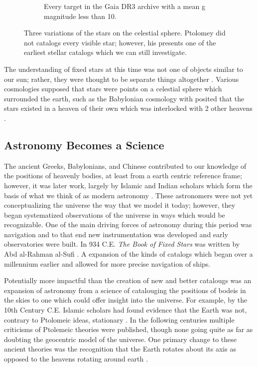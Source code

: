 \begin{figure}[htbp]
\begin{subfigure}[t]{0.3\textwidth}
      \caption{Every target in the Gaia DR3 archive with a mean g magnitude less than 10. }
      \label{fig:starsL10}
  \end{subfigure}
  \caption{Three variations of the stars on the celestial sphere. Ptolomey did
  not catalogs every visible star; however, his presents one of the earliest
  stellar catalogs which we can still investigate.}
  \label{fig:starsInHistory}
\end{figure}

The understanding of fixed stars at this time was not one of objects similar to
our sun; rather, they were thought to be separate things altogether
\citep{Evans1998, Noegel2010, Penprase2017}. Various cosmologies supposed that
stars were points on a celestial sphere which surrounded the earth, such as the
Babylonian cosmology with posited that the stars existed in a heaven of their
own which was interlocked with 2 other heavens \citep{Lambert1987, Steele2016}.

\subsection{Astronomy Becomes a Science}
The ancient Greeks, Babylonians, and Chinese contributed to our knowledge of
the positions of heavenly bodies, at least from a earth centric reference
frame; however, it was later work, largely by Islamic and Indian scholars which
form the basis of what we think of as modern astronomy \citep{Saliba1982,
Evans1998, Saliba2002, Kapoor2018, Kolachana2019}. These astronomers were not
yet conceptualizing the universe the way that we model it today; however, they
began systematized observations of the universe in ways which would be
recognizable. One of the main driving forces of astronomy during this period
was navigation and to that end new instrumentation was developed and early
observatories were built. In 934 C.E. \textit{The Book of Fixed Stars} was
written by Abd al-Rahman al-Sufi \citep{Hafez2010, Hafez2015}. A expansion of
the kinds of catalogs which began over a millennium earlier and allowed for
more precise navigation of ships. 

Potentially more impactful than the creation of new and better catalougs was an
expansion of astronomy from a science of catalouging the positions of bodeis in
the skies to one which could offer insight into the universe. For example, by
the 10th Century C.E. Islamic scholars had found evidence that the Earth was
not, contrary to Ptolomeic ideas, stationary \citep{Baga2020}. In
the following centuries multiple criticisms of Ptolemeic theories were
published, though none going quite as far as doubting the geocentric model of
the universe. One primary change to these ancient theories was the recognition
that the Earth rotates about its axis as opposed to the heavens rotating around
earth \citep{Bendaoud2023}. 

